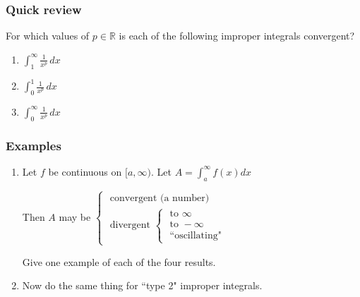 \documentclass[14pt]{beamer}
\begin{document}
	\begin{frame}[t]
		\frametitle{Quick review}

		For which values of $\displaystyle p \in \mathbb{R}$ is each of the
		following improper integrals convergent?

		\begin{enumerate}
			\item $\displaystyle \int_{1}^{\infty}\frac{1}{x^{p}}\, dx$

				\vfill

			\item $\displaystyle \int_{0}^{1}\frac{1}{x^{p}}\, dx$

				\vfill

			\item $\displaystyle \int_{0}^{\infty}\frac{1}{x^{p}}\, dx$
		\end{enumerate}
	\end{frame}

	\begin{frame}[t]
		\frametitle{Examples}

		\begin{enumerate}
			\item Let $f$ be continuous on $[a, \infty)$. Let
				$\displaystyle A = \int_{a}^{\infty}f(x) dx$

				Then $A$ may be $\displaystyle
				\begin{cases}
					\text{ convergent (a number) }                                                                                  \\
					\text{ divergent } \begin{cases}\text{ to } \infty \\ \text{ to } - \infty \\ \text{ ``oscillating"}\end{cases}
				\end{cases}$

				Give one example of each of the four results.
				\vfill

			\item Now do the same thing for ``type 2" improper integrals.
		\end{enumerate}
		\vfill
	\end{frame}
\end{document}
